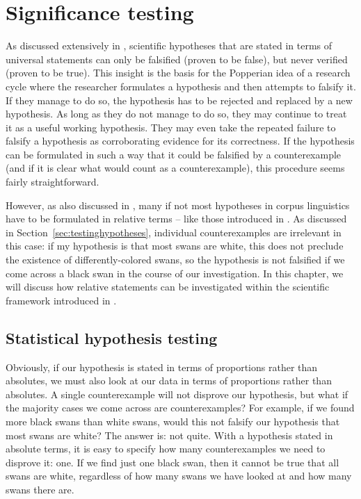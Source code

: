 \chapter{Significance testing}
\label{ch:significancetesting}

As discussed extensively in , scientific hypotheses  that are stated in terms of universal statements can only be falsified  (proven to be false), but never verified (proven to be true). This insight is the basis for the Popperian idea of a research cycle where the researcher formulates a hypothesis and then attempts to falsify it. If they manage to do so, the hypothesis has to be rejected and replaced by a new hypothesis. As long as they do not manage to do so, they may continue to treat it as a useful working hypothesis.  They may even take the repeated failure to falsify  a hypothesis as corroborating  evidence for its correctness. If the hypothesis can be formulated in such a way that it could be falsified by a counterexample  (and if it is clear what would count as a counterexample), this procedure seems fairly straightforward.

However, as also discussed in , many if not most hypotheses  in corpus linguistics have to be formulated in relative terms -- like those introduced in . As discussed in Section~\ref{sec:testinghypotheses}, individual counterexamples  are irrelevant in this case: if my hypothesis is that most swans are white, this does not preclude the existence of differently\hyp{}colored swans, so the hypothesis is not falsified  if we come across a black swan in the course of our investigation. In this chapter, we will discuss how relative statements can be investigated within the scientific framework introduced in .

\section{Statistical hypothesis testing}
\label{sec:statisticalhypothesistesting}

Obviously, if our hypothesis  is stated in terms of proportions rather than absolutes, we must also look at our data in terms of proportions rather than absolutes. A single counterexample  will not disprove our hypothesis, but what if the majority cases we come across are counterexamples? For example, if we found more black swans than white swans, would this not falsify  our hypothesis that most swans are white? The answer is: not quite. With a hypothesis stated in absolute terms, it is easy to specify how many counterexamples  we need to disprove it: one. If we find just one black swan, then it cannot be true that all swans are white, regardless of how many swans we have looked at and how many swans there are.

